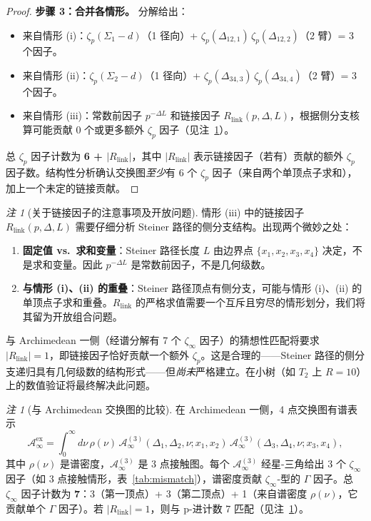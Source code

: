\documentclass[11pt,a4paper]{ctexart}
\theoremstyle{remark}
\newtheorem{remark}[theorem]{注}
\begin{document}
\begin{proof}
\textbf{步骤 3：合并各情形。} 分解给出：
\begin{itemize}[leftmargin=2em]
    \item 来自情形 (i)：$\zeta_p(\Sigma_1 - d)$（1 径向）+ $\zeta_p(\Delta_{12,1})\,\zeta_p(\Delta_{12,2})$（2 臂）= 3 个因子。
    \item 来自情形 (ii)：$\zeta_p(\Sigma_2 - d)$（1 径向）+ $\zeta_p(\Delta_{34,3})\,\zeta_p(\Delta_{34,4})$（2 臂）= 3 个因子。
    \item 来自情形 (iii)：常数前因子 $p^{-\Delta L}$ 和链接因子 $R_{\mathrm{link}}(p, \Delta, L)$，根据侧分支核算可能贡献 0 个或更多额外 $\zeta_p$ 因子（见注~\ref{rem:link-caveat}）。
\end{itemize}
总 $\zeta_p$ 因子计数为 \textbf{6 + $|R_{\mathrm{link}}|$}，其中 $|R_{\mathrm{link}}|$ 表示链接因子（若有）贡献的额外 $\zeta_p$ 因子数。结构性分析确认交换图\emph{至少}有 6 个 $\zeta_p$ 因子（来自两个单顶点子求和），加上一个未定的链接贡献。\qedhere
\end{proof}

\begin{remark}[关于链接因子的注意事项及开放问题]
\label{rem:link-caveat}
情形 (iii) 中的链接因子 $R_{\mathrm{link}}(p, \Delta, L)$ 需要仔细分析 Steiner 路径的侧分支结构。出现两个微妙之处：
\begin{enumerate}[leftmargin=2em]
    \item \textbf{固定值 vs.\ 求和变量}：Steiner 路径长度 $L$ 由边界点 $\{x_1, x_2, x_3, x_4\}$ 决定，不是求和变量。因此 $p^{-\Delta L}$ 是常数前因子，不是几何级数。
    \item \textbf{与情形 (i)、(ii) 的重叠}：Steiner 路径顶点有侧分支，可能与情形 (i)、(ii) 的单顶点子求和重叠。$R_{\mathrm{link}}$ 的严格求值需要一个互斥且穷尽的情形划分，我们将其留为开放组合问题。
\end{enumerate}
与 Archimedean 一侧（经谱分解有 7 个 $\zeta_\infty$ 因子）的猜想性匹配将要求 $|R_{\mathrm{link}}| = 1$，即链接因子恰好贡献一个额外 $\zeta_p$。这是合理的——Steiner 路径的侧分支递归具有几何级数的结构形式——但\emph{尚未}严格建立。在小树（如 $T_2$ 上 $R = 10$）上的数值验证将最终解决此问题。
\end{remark}

\begin{remark}[与 Archimedean 交换图的比较]
\label{rem:exch-arch}
在 Archimedean 一侧，4 点交换图有谱表示
\begin{equation}
\label{eq:arch-exch}
\mathcal{A}^{\mathrm{ex}}_{\infty} = \int_0^\infty d\nu\, \rho(\nu) \, \mathcal{A}^{(3)}_\infty(\Delta_1, \Delta_2, \nu; x_1, x_2) \, \mathcal{A}^{(3)}_\infty(\Delta_3, \Delta_4, \nu; x_3, x_4),
\end{equation}
其中 $\rho(\nu)$ 是谱密度，$\mathcal{A}^{(3)}_\infty$ 是 3 点接触图。每个 $\mathcal{A}^{(3)}_\infty$ 经星-三角给出 3 个 $\zeta_\infty$ 因子（如 3 点接触情形，表~\ref{tab:mismatch}），谱密度贡献 $\zeta_\infty$-型的 $\Gamma$ 因子。总 $\zeta_\infty$ 因子计数为 \textbf{7}：3（第一顶点）+ 3（第二顶点）+ 1（来自谱密度 $\rho(\nu)$，它贡献单个 $\Gamma$ 因子）。若 $|R_{\mathrm{link}}| = 1$，则与 p-进计数 7 匹配（见注~\ref{rem:link-caveat}）。
\end{remark}
\end{document}
